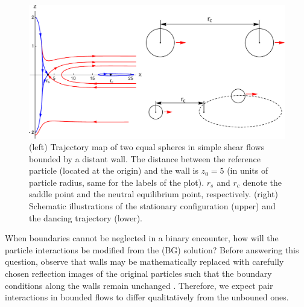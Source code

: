 \begin{figure}%
  \centering
  \includegraphics[width=\columnwidth]{itzhak-boris.pdf}
  \caption{
  (left) Trajectory map of two equal spheres in simple shear flows bounded by a distant wall. The distance between the reference particle (located at the origin) and the wall is $z_0=5$ (in units of particle radius, same for the labels of the plot). $r_s$ and $r_c$ denote the saddle point and the neutral equilibrium point, respectively.
  (right) Schematic illustrations of the stationary configuration (upper) and the dancing trajectory (lower).}
  \label{fig:itzhak-boris}
\end{figure}

When boundaries cannot be neglected in a binary encounter, how will the particle interactions be modified from the \cite{batchelor_green_1972} (BG) solution?
Before answering this question, observe that walls may be mathematically replaced with carefully chosen reflection images of the original particles such that the boundary conditions along the walls remain unchanged \citep{blake_1971, LironMochon}.
Therefore, we expect pair interactions in bounded flows to differ qualitatively from the unbouned ones.

